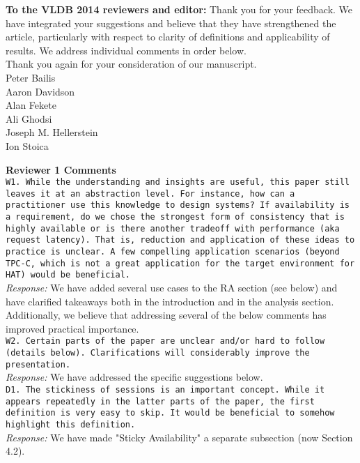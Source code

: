 \documentclass[10pt]{article}
\newcommand{\reviewer}[1] {\noindent\texttt{#1}\\}
\newcommand{\response}[1] {\noindent\textit{Response: } #1\\}
\begin{document}
\noindent\textbf{To the VLDB 2014 reviewers and editor:} Thank you for your
feedback. We have integrated your suggestions and believe that they
have strengthened the article, particularly with respect to clarity of
definitions and applicability of results. We address individual
comments in order below.\\

\noindent Thank you again for your consideration of our manuscript.\\

\noindent Peter Bailis\\
Aaron Davidson\\
Alan Fekete\\
Ali Ghodsi\\
Joseph M. Hellerstein\\
Ion Stoica

\newpage
\noindent\textbf{Reviewer 1 Comments}\\


\reviewer{W1. While the understanding and insights are useful, this paper still leaves it at an abstraction level. For instance, how can a practitioner use this knowledge to design systems? If availability is a requirement, do we chose the strongest form of consistency that is highly available or is there another tradeoff with performance (aka request latency). That is, reduction and application of these ideas to practice is unclear. A few compelling application scenarios (beyond TPC-C, which is not a great application for the target environment for HAT) would be beneficial.}

\response{We have added several use cases to the RA section (see
  below) and have clarified takeaways both in the introduction and in
  the analysis section. Additionally, we believe that addressing
  several of the below comments has improved practical importance.}

\reviewer{W2. Certain parts of the paper are unclear and/or hard to follow (details below). Clarifications will considerably improve the presentation.}

\response{We have addressed the specific suggestions below.}

\reviewer{D1. The stickiness of sessions is an important concept. While it appears repeatedly in the latter parts of the paper, the first definition is very easy to skip. It would be beneficial to somehow highlight this definition.}

\response{We have made "Sticky Availability" a separate subsection (now Section 4.2).}
\end{document}
